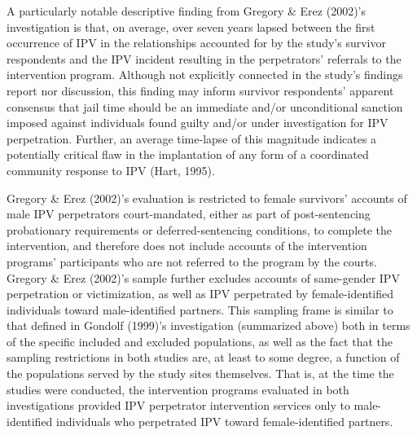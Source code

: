 \documentclass[11pt,]{tufte-book}
\begin{document}
A particularly notable descriptive finding from Gregory \& Erez (2002)'s
investigation is that, on average, over seven years lapsed between the
first occurrence of IPV in the relationships accounted for by the
study's survivor respondents and the IPV incident resulting in the
perpetrators' referrals to the intervention program. Although not
explicitly connected in the study's findings report nor discussion, this
finding may inform survivor respondents' apparent consensus that jail
time should be an immediate and/or unconditional sanction imposed
against individuals found guilty and/or under investigation for IPV
perpetration. Further, an average time-lapse of this magnitude indicates
a potentially critical flaw in the implantation of any form of a
coordinated community response to IPV (Hart, 1995).

Gregory \& Erez (2002)'s evaluation is restricted to female survivors'
accounts of male IPV perpetrators court-mandated, either as part of
post-sentencing probationary requirements or deferred-sentencing
conditions, to complete the intervention, and therefore does not include
accounts of the intervention programs' participants who are not referred
to the program by the courts. Gregory \& Erez (2002)'s sample further
excludes accounts of same-gender IPV perpetration or victimization, as
well as IPV perpetrated by female-identified individuals toward
male-identified partners. This sampling frame is similar to that defined
in Gondolf (1999)'s investigation (summarized above) both in terms of
the specific included and excluded populations, as well as the fact that
the sampling restrictions in both studies are, at least to some degree,
a function of the populations served by the study sites themselves. That
is, at the time the studies were conducted, the intervention programs
evaluated in both investigations provided IPV perpetrator intervention
services only to male-identified individuals who perpetrated IPV toward
female-identified partners.
\end{document}

